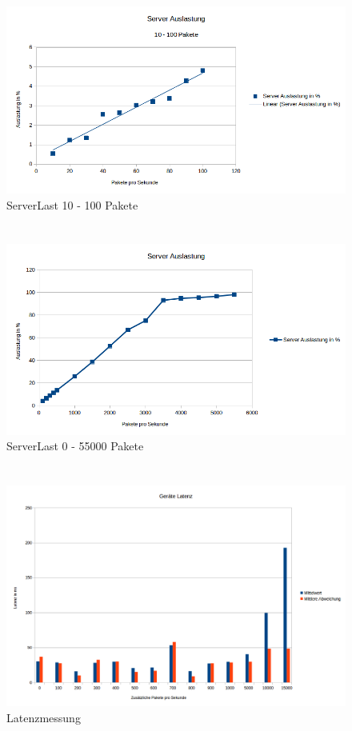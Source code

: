 \documentclass[a4paper]{spie}  %
\begin{document}
\section{}
\begin{figure}[H]
	\centering
	\includegraphics[width=1\textwidth]{images/ServerLast2.png}
	\caption{ServerLast 10 - 100 Pakete}
	\label{serverlast1-2}
\end{figure}


\section{}
\begin{figure}[H]
	\centering
	\includegraphics[width=1\textwidth]{images/ServerLast3.png}
	\caption{ServerLast 0 - 55000 Pakete}
	\label{serverlast2}
\end{figure}

\section{}
\begin{figure}[H]
	\centering
	\includegraphics[width=1\textwidth]{images/LatenzMessung.png}
	\caption{Latenzmessung}
	\label{latenzmessung}
\end{figure}
\end{document}
